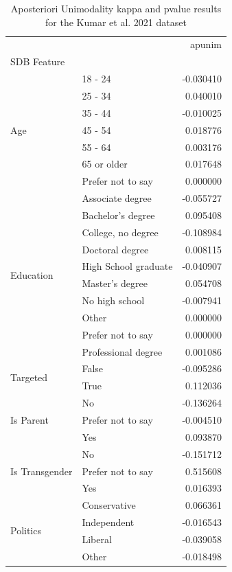 \begin{table}
\caption{Aposteriori Unimodality kappa and pvalue results for the Kumar et al. 2021 dataset}
\label{tab:results_apunim_only_kumar}
\begin{tabular}{llr}
\toprule
 &  & apunim \\
SDB Feature &  &  \\
\midrule
\multirow[t]{7}{*}{Age} & 18 - 24 & -0.030410 \\
 & 25 - 34 & 0.040010 \\
 & 35 - 44 & -0.010025 \\
 & 45 - 54 & 0.018776 \\
 & 55 - 64 & 0.003176 \\
 & 65 or older & 0.017648 \\
 & Prefer not to say & 0.000000 \\
\cline{1-3}
\multirow[t]{10}{*}{Education} & Associate degree & -0.055727 \\
 & Bachelor's degree & 0.095408 \\
 & College, no degree & -0.108984 \\
 & Doctoral degree & 0.008115 \\
 & High School graduate & -0.040907 \\
 & Master's degree & 0.054708 \\
 & No high school & -0.007941 \\
 & Other & 0.000000 \\
 & Prefer not to say & 0.000000 \\
 & Professional degree & 0.001086 \\
\cline{1-3}
\multirow[t]{2}{*}{Targeted} & False & -0.095286 \\
 & True & 0.112036 \\
\cline{1-3}
\multirow[t]{3}{*}{Is Parent} & No & -0.136264 \\
 & Prefer not to say & -0.004510 \\
 & Yes & 0.093870 \\
\cline{1-3}
\multirow[t]{3}{*}{Is Transgender} & No & -0.151712 \\
 & Prefer not to say & 0.515608 \\
 & Yes & 0.016393 \\
\cline{1-3}
\multirow[t]{5}{*}{Politics} & Conservative & 0.066361 \\
 & Independent & -0.016543 \\
 & Liberal & -0.039058 \\
 & Other & -0.018498 \\

\end{tabular}
\end{table}
